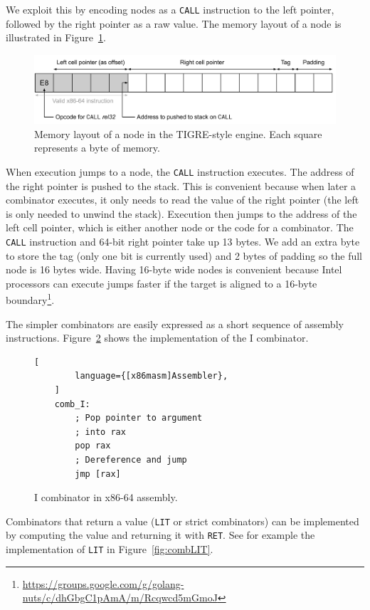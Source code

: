 \documentclass[conference]{IEEEtran}
\begin{document}
We exploit this by encoding nodes as a \texttt{CALL} instruction to the left pointer, followed by the right pointer as a raw value.
The memory layout of a node is illustrated in Figure~\ref{fig:tigre_layout}.

\begin{figure}
    \includegraphics[width=1.4\columnwidth]{tigre_layout}
    \centering
    \caption{
        Memory layout of a node in the TIGRE-style engine.
        Each square represents a byte of memory.
    }
    \label{fig:tigre_layout}
\end{figure}

When execution jumps to a node, the \texttt{CALL} instruction executes.
The address of the right pointer is pushed to the stack.
This is convenient because when later a combinator executes, it only needs to read the value of the right pointer (the left is only needed to unwind the stack).
Execution then jumps to the address of the left cell pointer, which is either another node or the code for a combinator.
The \texttt{CALL} instruction and 64-bit right pointer take up 13 bytes.
We add an extra byte to store the tag (only one bit is currently used) and 2 bytes of padding so the full node is 16 bytes wide.
Having 16-byte wide nodes is convenient because Intel processors can execute jumps faster if the target is aligned to a 16-byte boundary\footnote{\url{https://groups.google.com/g/golang-nuts/c/dhGbgC1pAmA/m/Rcqwcd5mGmoJ}}.

The simpler combinators are easily expressed as a short sequence of assembly instructions.
Figure~\ref{fig:combI} shows the implementation of the I combinator.

\begin{figure}
    \begin{lstlisting}[
        language={[x86masm]Assembler},
    ]
    comb_I:
        ; Pop pointer to argument
        ; into rax
        pop rax
        ; Dereference and jump
        jmp [rax]
    \end{lstlisting}
    \centering
    \caption{I combinator in x86-64 assembly.}
    \label{fig:combI}
\end{figure}

Combinators that return a value (\texttt{LIT} or strict combinators) can be implemented by computing the value and returning it with \texttt{RET}.
See for example the implementation of \texttt{LIT} in Figure~\ref{fig:combLIT}.
\end{document}
